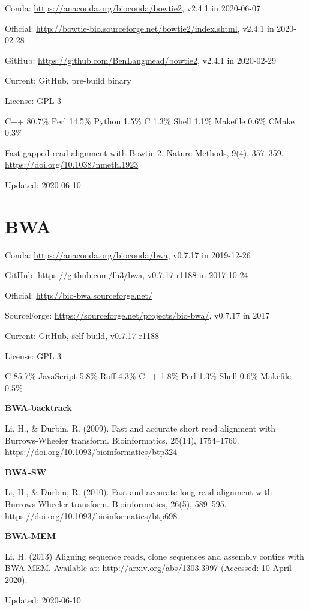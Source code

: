 \documentclass[]{article}
\begin{document}
Conda: \url{https://anaconda.org/bioconda/bowtie2}, v2.4.1 in 2020-06-07

Official: \url{http://bowtie-bio.sourceforge.net/bowtie2/index.shtml}, v2.4.1 in 2020-02-28

GitHub: \url{https://github.com/BenLangmead/bowtie2}, v2.4.1 in 2020-02-29

Current: GitHub, pre-build binary

License: GPL 3

C++ 80.7\% Perl 14.5\% Python 1.5\% C 1.3\% Shell 1.1\% Makefile 0.6\% CMake 0.3\%

Fast gapped-read alignment with Bowtie 2. Nature Methods, 9(4), 357–359. \url{https://doi.org/10.1038/nmeth.1923}

Updated: 2020-06-10


\section{BWA}

Conda: \url{https://anaconda.org/bioconda/bwa}, v0.7.17 in 2019-12-26

GitHub: \url{https://github.com/lh3/bwa}, v0.7.17-r1188 in 2017-10-24

Official: \url{http://bio-bwa.sourceforge.net/}

SourceForge: \url{https://sourceforge.net/projects/bio-bwa/}, v0.7.17 in 2017

Current: GitHub, self-build, v0.7.17-r1188

License: GPL 3

C 85.7\% JavaScript 5.8\% Roff 4.3\% C++ 1.8\% Perl 1.3\% Shell 0.6\% Makefile 0.5\%

\textbf{BWA-backtrack}

Li, H., \& Durbin, R. (2009). Fast and accurate short read alignment with Burrows-Wheeler transform. Bioinformatics, 25(14), 1754–1760. \url{https://doi.org/10.1093/bioinformatics/btp324}

\textbf{BWA-SW}

Li, H., \& Durbin, R. (2010). Fast and accurate long-read alignment with Burrows-Wheeler transform. Bioinformatics, 26(5), 589–595. \url{https://doi.org/10.1093/bioinformatics/btp698}

\textbf{BWA-MEM}

Li, H. (2013) Aligning sequence reads, clone sequences and assembly contigs with BWA-MEM. Available at: \url{http://arxiv.org/abs/1303.3997} (Accessed: 10 April 2020).

Updated: 2020-06-10
\end{document}
